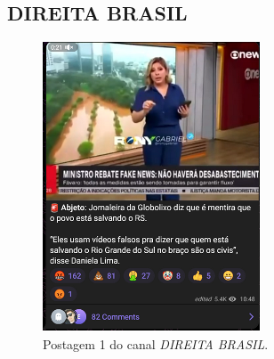 \documentclass[portuguese]{textolivre}
\begin{document}
\subsection{DIREITA BRASIL}
\begin{figure}[h!]
    \centering
    \begin{minipage}[t]{0.30\textwidth}
        \centering
        \includegraphics[width=\linewidth]{Imagens/Fig28.png}
        \caption{Postagem 1 do canal \emph{DIREITA BRASIL}.}
        \label{fig-28}
    \end{minipage}\hfill
    \begin{minipage}[t]{0.21\textwidth}
        \centering

\end{minipage}
\end{figure}
\end{document}
